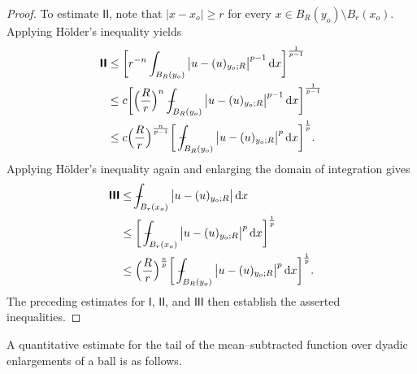 \documentclass[10pt,letterpaper]{amsart}
\theoremstyle{definition}
\numberwithin{theorem}{section}
\numberwithin{equation}{section}
\newcommand{\mint}{- \mskip-19,5mu \int}
\newcommand{\1}{\ensuremath{\mathds{1}}}
\newcommand\sfI{{\boldsymbol{\mathsf I}}}
\numberwithin{equation}{section}
\begin{document}
\begin{proof}
To estimate $\sfI\sfI$, note that $|x-x_o|\ge r$ for every $x\in B_R(y_o)\setminus B_r(x_o)$.  
Applying H\"older's inequality yields
\begin{align*}
    \sfI\sfI
    &\le
    \bigg[
        r^{-n}
        \int_{B_R(y_o)}
            \big|u-(u)_{{y_o;R}}\big|^{p-1}\,\mathrm dx
    \bigg]^{\frac{1}{p-1}} \\
    &\le c
    \bigg[
        \Big(\frac{R}{r}\Big)^{n}
        \mint_{B_R(y_o)}
            \big|u-(u)_{{y_o;R}}\big|^{p-1}\,\mathrm dx
    \bigg]^{\frac{1}{p-1}} \\
    &\le
    c \Big(\frac{R}{r}\Big)^{\frac{n}{p-1}}
    \bigg[
        \mint_{B_R(y_o)}
            \big|u-(u)_{{y_o;R}}\big|^{p}\,\mathrm dx
    \bigg]^{\frac{1}{p}} .
\end{align*}
Applying H\"older's inequality again and enlarging the domain of integration gives
\begin{align*}
    \sfI\sfI\sfI
    &\le
    \mint_{B_r(x_o)}
        \big|u-(u)_{{y_o;R}}\big|\,\mathrm dx \\
    &\le
    \bigg[
        \mint_{B_r(x_o)}
            \big|u-(u)_{{y_o;R}}\big|^{p}\,\mathrm dx
    \bigg]^{\frac{1}{p}} \\
    &\le
    \Big(\frac{R}{r}\Big)^{\frac{n}{p}}
    \bigg[
        \mint_{B_R(y_o)}
            \big|u-(u)_{{y_o;R}}\big|^{p}\,\mathrm dx
    \bigg]^{\frac{1}{p}} .
\end{align*}
The preceding estimates for $\sfI$, $\sfI\sfI$, and $\sfI\sfI\sfI$ then establish the asserted inequalities.
\end{proof}

A quantitative estimate for the tail of the mean–subtracted function over dyadic enlargements of a ball is as follows.
\end{document}
